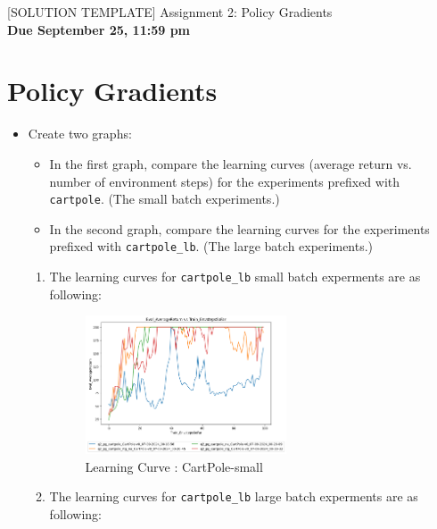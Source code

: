 \documentclass{article}
\begin{document}

\begin{centering}
    {\Large [SOLUTION TEMPLATE] Assignment 2: Policy Gradients} \\
    \vspace{.25cm}
    \textbf{Due September 25, 11:59 pm} \\
\end{centering}

\setcounter{section}{3}
\section{Policy Gradients}
\begin{itemize}
\item Create two graphs:
\begin{itemize}
\item In the first graph, compare the learning curves (average return vs. number of environment steps) for the experiments prefixed with \verb|cartpole|. (The small batch experiments.)
\item In the second graph, compare the learning curves for the experiments prefixed with \verb|cartpole_lb|. (The large batch experiments.)
\end{itemize}
\begin{enumerate}[]
	\item The learning curves for \verb|cartpole_lb| small batch experments are as following: 
		\begin{figure}[ht]
			\centering
			\includegraphics[width=0.6\textwidth]{./images/4-CartPole-small.png}
			\caption{Learning Curve : CartPole-small}
			\label{fig:CartPole-small}
		\end{figure}
	\item The learning curves for \verb|cartpole_lb| large batch experments are as following:
		\begin{figure}[ht]
			\centering

\end{figure}
\end{enumerate}
\end{itemize}
\end{document}
